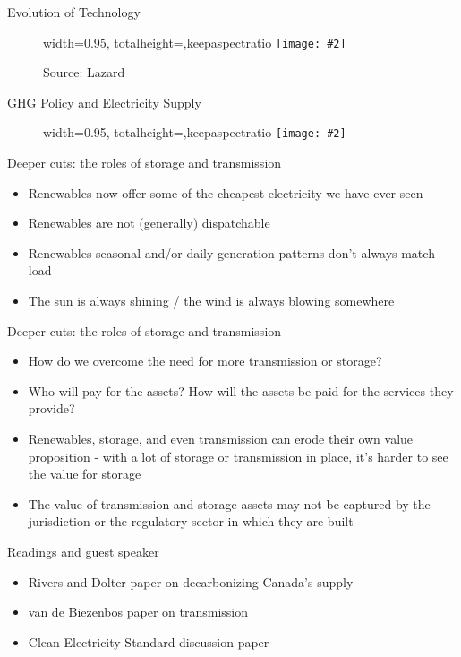 \documentclass[aspectratio=169]{beamer}
\makeatletter
\renewcommand{\(}{\begin{columns}}
\renewcommand{\)}{\end{columns}}
\newcommand{\<}[1]{\begin{column}{#1}}
\renewcommand{\>}{\end{column}}
\newcommand{\fitimage}[2][\@nil]{
  \begin{figure}
    \begin{adjustbox}{width=0.95\textwidth, totalheight=\textheight-2\baselineskip-2\baselineskip,keepaspectratio}
      \texttt{[image: \#2]}
    \end{adjustbox}
    \def\tmp{#1}%
   \ifx\tmp\@nnil
      \else
      \newline{\tiny{#1}}
    \fi
  \end{figure}
}
\makeatother
\begin{document}
\begin{frame}{Evolution of Technology}
   \fitimage[Source: Lazard]{../images/lazard_decline.png}
   \vfill
\end{frame}


\begin{frame}{GHG Policy and Electricity Supply}
   \fitimage{../images/monthly_ghgs.png}
   \vfill
\end{frame}


\begin{frame}{Deeper cuts: the roles of storage and transmission}
\begin{itemize}
\setlength\itemsep{2em}
\item Renewables now offer some of the cheapest electricity we have ever seen
\item Renewables are not (generally) dispatchable
\item Renewables seasonal and/or daily generation patterns don't always match load
\item The sun is always shining / the wind is always blowing somewhere
\end{itemize}

\vfill \end{frame}



\begin{frame}{Deeper cuts: the roles of storage and transmission}
\begin{itemize}
\setlength\itemsep{2em}
\item How do we overcome the need for more transmission or storage?
\item Who will pay for the assets? How will the assets be paid for the services they provide?
\item Renewables, storage, and even transmission can erode their own value proposition - with a lot of storage or transmission in place, it's harder to see the value for storage
\item The value of transmission and storage assets may not be captured by the jurisdiction or the regulatory sector in which they are built

\end{itemize}

\vfill \end{frame}



\begin{frame}{Readings and guest speaker}
\begin{itemize}
\setlength\itemsep{2em}
\item Rivers and Dolter paper on decarbonizing Canada's supply
\item van de Biezenbos paper on transmission

\item Clean Electricity Standard discussion paper

\end{itemize}

\vfill \end{frame}
\end{document}

